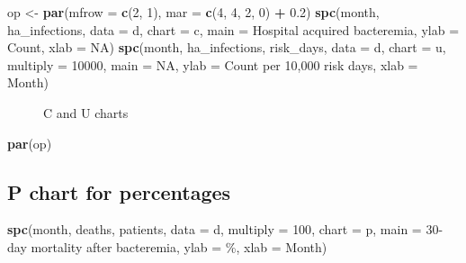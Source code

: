 \documentclass[
]{book}
\makeatletter
\newenvironment{Shaded}{\begin{snugshade}}{\end{snugshade}}
\newcommand{\AttributeTok}[1]{\textcolor[rgb]{0.13,0.29,0.53}{#1}}
\newcommand{\ConstantTok}[1]{\textcolor[rgb]{0.56,0.35,0.01}{#1}}
\newcommand{\DecValTok}[1]{\textcolor[rgb]{0.00,0.00,0.81}{#1}}
\newcommand{\FloatTok}[1]{\textcolor[rgb]{0.00,0.00,0.81}{#1}}
\newcommand{\FunctionTok}[1]{\textcolor[rgb]{0.13,0.29,0.53}{\textbf{#1}}}
\newcommand{\NormalTok}[1]{#1}
\newcommand{\OtherTok}[1]{\textcolor[rgb]{0.56,0.35,0.01}{#1}}
\newcommand{\SpecialCharTok}[1]{\textcolor[rgb]{0.81,0.36,0.00}{\textbf{#1}}}
\newcommand{\StringTok}[1]{\textcolor[rgb]{0.31,0.60,0.02}{#1}}
\newcommand*\pandocbounded[1]{%
  \sbox\pandoc@box{#1}%
  \Gscale@div\@tempa{\textheight}{\dimexpr\ht\pandoc@box+\dp\pandoc@box\relax}%
  \Gscale@div\@tempb{\linewidth}{\wd\pandoc@box}%
  \ifdim\@tempb\p@<\@tempa\p@\let\@tempa\@tempb\fi%
  \ifdim\@tempa\p@<\p@\scalebox{\@tempa}{\usebox\pandoc@box}%
  \else\usebox{\pandoc@box}%
  \fi%
}
\makeatother
\begin{document}
\begin{Shaded}
\begin{Highlighting}[]
\NormalTok{op }\OtherTok{\textless{}{-}} \FunctionTok{par}\NormalTok{(}\AttributeTok{mfrow =} \FunctionTok{c}\NormalTok{(}\DecValTok{2}\NormalTok{, }\DecValTok{1}\NormalTok{),}
          \AttributeTok{mar   =} \FunctionTok{c}\NormalTok{(}\DecValTok{4}\NormalTok{, }\DecValTok{4}\NormalTok{, }\DecValTok{2}\NormalTok{, }\DecValTok{0}\NormalTok{) }\SpecialCharTok{+} \FloatTok{0.2}\NormalTok{)}
\FunctionTok{spc}\NormalTok{(month, ha\_infections,}
    \AttributeTok{data =}\NormalTok{ d,}
    \AttributeTok{chart    =} \StringTok{\textquotesingle{}c\textquotesingle{}}\NormalTok{,}
    \AttributeTok{main     =} \StringTok{\textquotesingle{}Hospital acquired bacteremia\textquotesingle{}}\NormalTok{,}
    \AttributeTok{ylab     =} \StringTok{\textquotesingle{}Count\textquotesingle{}}\NormalTok{,}
    \AttributeTok{xlab     =} \ConstantTok{NA}\NormalTok{)}
\FunctionTok{spc}\NormalTok{(month, ha\_infections, risk\_days,}
    \AttributeTok{data     =}\NormalTok{ d,}
    \AttributeTok{chart    =} \StringTok{\textquotesingle{}u\textquotesingle{}}\NormalTok{,}
    \AttributeTok{multiply =} \DecValTok{10000}\NormalTok{,}
    \AttributeTok{main     =} \ConstantTok{NA}\NormalTok{,}
    \AttributeTok{ylab     =} \StringTok{\textquotesingle{}Count per 10,000 risk days\textquotesingle{}}\NormalTok{,}
    \AttributeTok{xlab     =} \StringTok{\textquotesingle{}Month\textquotesingle{}}\NormalTok{)}
\end{Highlighting}
\end{Shaded}

\begin{figure}
\centering
\pandocbounded{}
\caption{\label{fig:rfun-cu}C and U charts}
\end{figure}

\begin{Shaded}
\begin{Highlighting}[]
\FunctionTok{par}\NormalTok{(op)}
\end{Highlighting}
\end{Shaded}

\subsection{P chart for percentages}\label{p-chart-for-percentages}

\begin{Shaded}
\begin{Highlighting}[]
\FunctionTok{spc}\NormalTok{(month, deaths, patients,}
    \AttributeTok{data     =}\NormalTok{ d,}
    \AttributeTok{multiply =} \DecValTok{100}\NormalTok{,}
    \AttributeTok{chart    =} \StringTok{\textquotesingle{}p\textquotesingle{}}\NormalTok{,}
    \AttributeTok{main     =} \StringTok{\textquotesingle{}30{-}day mortality after bacteremia\textquotesingle{}}\NormalTok{,}
    \AttributeTok{ylab     =} \StringTok{\textquotesingle{}\%\textquotesingle{}}\NormalTok{,}
    \AttributeTok{xlab     =} \StringTok{\textquotesingle{}Month\textquotesingle{}}\NormalTok{)}
\end{Highlighting}
\end{Shaded}
\end{document}
